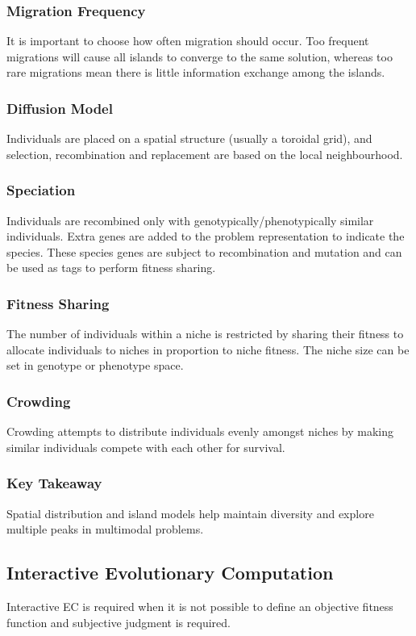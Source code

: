 \subsubsection*{Migration Frequency}
It is important to choose how often migration should occur. Too frequent migrations will cause all islands to converge to the same solution, whereas too rare migrations mean there is little information exchange among the islands.
\subsubsection*{Diffusion Model}
Individuals are placed on a spatial structure (usually a toroidal grid), and selection, recombination and replacement are based on the local neighbourhood.
\subsubsection*{Speciation}
Individuals are recombined only with genotypically/phenotypically similar individuals. Extra genes are added to the problem representation to indicate the species. These species genes are subject to recombination and mutation and can be used as tags to perform fitness sharing.
\subsubsection*{Fitness Sharing}
The number of individuals within a niche is restricted by sharing their fitness to allocate individuals to niches in proportion to niche fitness. The niche size can be set in genotype or phenotype space.
\subsubsection*{Crowding}
Crowding attempts to distribute individuals evenly amongst niches by making similar individuals compete with each other for survival.
\subsubsection*{Key Takeaway}
Spatial distribution and island models help maintain diversity and explore multiple peaks in multimodal problems.

\subsection*{Interactive Evolutionary Computation}
Interactive EC is required when it is not possible to define an objective fitness function and subjective judgment is required.
